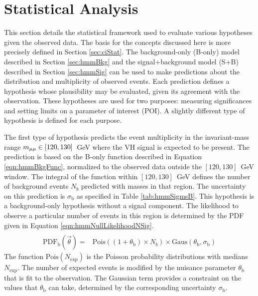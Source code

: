 \section{Statistical Analysis}\label{sec:hmmStat}

This section details the statistical framework used to evaluate various hypotheses given the observed data.
The basis for the concepts discussed here is more precisely defined in Section \ref{sec:ciStat}.
The background-only (B-only) model described in Section \ref{sec:hmmBkg} and the signal+background model (S+B) described in Section \ref{sec:hmmSig} can be used to make predictions about the \muu distribution and multiplicity of observed events.
Each prediction defines a hypothesis whose plausibility may be evaluated, given its agreement with the observation.
These hypotheses are used for two purposes: measuring significances and setting limits on a parameter of interest (POI).
A slightly different type of hypothesis is defined for each purpose.

The first type of hypothesis predicts the event multiplicity in the invariant-mass range $m_{\mu\mu}\in[120,130]$~GeV where the VH signal is expected to be present.
The prediction is based on the B-only function described in Equation \ref{eqn:hmmBkgFunc}, normalized to the observed data outside the $[120,130]$~GeV window.
The integral of the function within $[120,130]$~GeV defines the number of background events $N_b$ predicted with masses in that region.
The uncertainty on this prediction is $\sigma_\text{b}$ as specified in Table \ref{tab:hmmSigmsB}.
This hypothesis is a background-only hypothesis without a signal component.
The likelihood to observe a particular number of events in this region is determined by the PDF given in Equation \ref{eqn:hmmNullLikelihoodNSig}.
\begin{equation}\begin{split}\label{eqn:hmmNullLikelihoodNSig}\\
\text{PDF}_\text{b}(\vec{\theta}) =& \text{Pois}((1+\theta_\text{b})\times N_b) \times \text{Gaus}(\theta_\text{b},\sigma_\text{b}) 
\end{split}\end{equation} 
The function $\text{Pois}(N_\text{exp})$ is the Poisson probability distributions with medians $N_\text{exp}$.
The number of expected events is modified by the nuisance parameter $\theta_\text{b}$ that is fit to the observation.
The Gaussian term provides a constraint on the values that $\theta_\text{b}$ can take, determined by the corresponding uncertainty $\sigma_\text{b}$.

